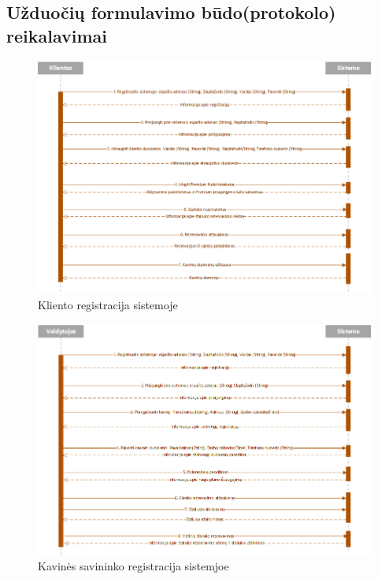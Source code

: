 \documentclass{VUMIFPSkursinis}
\begin{document}
\begin{landscape}
\subsection{Užduočių formulavimo būdo(protokolo) reikalavimai}
	\begin {figure}[H]
		\includegraphics[width=1.2\textwidth,height=1.3\textheight,keepaspectratio]{img/b}
		\caption{Kliento registracija sistemoje}
		\label{fig:b}
	\end{figure}
\end{landscape}

\begin{landscape}
	\begin {figure}[H]
		\includegraphics[width=1.3\textwidth,height=1.4\textheight,keepaspectratio]{img/c}
		\caption{Kavinės savininko registracija sistemjoe}
		\label{fig:c}
	\end{figure}
\end{landscape}
\end{document}
